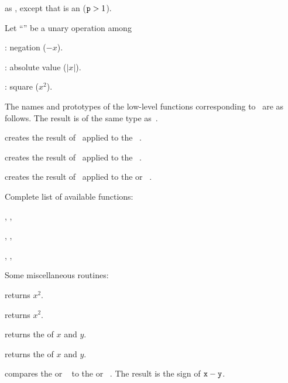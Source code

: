  as ,
except that  is an  (${\tt p} > 1$).

 Let ``\op'' be a unary operation among

\item {}: negation ($-x$).

\item {}: absolute value ($|x|$).

\item {}: square ($x^2$).

\noindent The names and prototypes of the low-level functions corresponding
to \op\ are as follows. The result is of the same type as~.

 creates the result of \op\ applied to the
~.

 creates the result of \op\ applied to the
~.

 creates the result of \op\ applied to the
 or ~.

\noindent Complete list of available functions:

, , 

, , 

, , 

\noindent Some miscellaneous routines:

 returns $x^2$.

 returns $x^2$.




 returns the  of $x$ and $y$.




 returns the  of $x$ and $y$.

\smallskip

 compares the  or ~
to the  or ~. The result is the sign of
${\tt x}-{\tt y}$.

